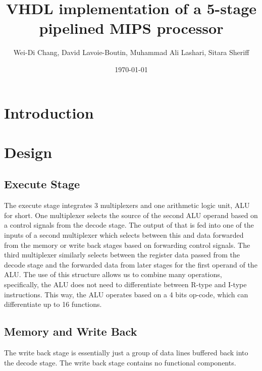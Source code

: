 \documentclass[12pt]{IEEEtran} %
\title{VHDL implementation of a 5-stage pipelined MIPS processor}
\date{\today}
\author{Wei-Di Chang, David Lavoie-Boutin, Muhammad Ali Lashari, Sitara Sheriff}
\begin{document}

\section{Introduction} %
\label{sec:introduction}

\section{Design} %
\label{sec:design}

\subsection{Execute Stage} %
\label{sub:execute_stage}
The execute stage integrates 3 multiplexers and one arithmetic logic unit, ALU for short. One multiplexer selects the source of the second ALU operand based on a control signals from the decode stage. The output of that is fed into one of the inputs of a second multiplexer which selects between this and data forwarded from the memory or write back stages based on forwarding control signals. The third multiplexer similarly selects between the register data passed from the decode stage and the forwarded data from later stages for the first operand of the ALU. The use of this structure allows us to combine many operations, specifically, the ALU does not need to differentiate between R-type and I-type instructions. This way, the ALU operates based on a 4 bits op-code, which can differentiate up to 16 functions. 

\subsection{Memory and Write Back} %
\label{sub:memory_and_write_back}
The write back stage is essentially just a group of data lines buffered back into the decode stage. The write back stage contains no functional components. 
\end{document}
